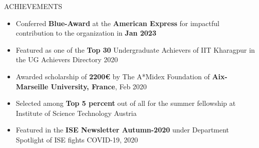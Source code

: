 \documentclass{resume} %
\begin{document}


\begin{rSection}{ACHIEVEMENTS} 
\begin{itemize}
    \item Conferred \textbf{Blue-Award} at the \textbf{American Express} for impactful contribution to the organization in \textbf{Jan 2023}  
    \item Featured as one of the \textbf{Top 30} Undergraduate Achievers of IIT Kharagpur in the UG Achievers Directory 2020
    \item Awarded scholarship of \textbf{2200€} by The A*Midex Foundation of \textbf{Aix-Marseille University, France}, Feb 2020
    \item Selected among \textbf{Top 5 percent} out of all for the summer fellowship at Institute of Science Technology Austria
    \item Featured in the \textbf{ISE Newsletter Autumn-2020} under Department Spotlight of ISE fights COVID-19, 2020
\end{itemize}

\end{rSection}
\end{document}
